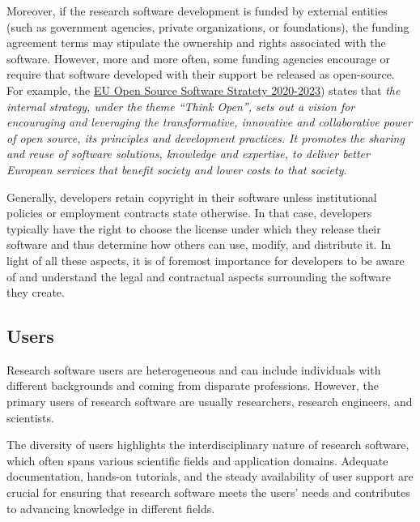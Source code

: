 Moreover, if the research software development is funded by external entities (such as government agencies, private organizations, or foundations), the funding agreement terms may stipulate the ownership and rights associated with the software. However, more and more often, some funding agencies encourage or require that software developed with their support be released as open-source. For example, the \href{https://commission.europa.eu/about-european-commission/departments-and-executive-agencies/digital-services/open-source-software-strategy_en}{EU Open Source Software Stratety 2020-2023}) states that \textit{the internal strategy, under the theme ``Think Open'', sets out a vision for encouraging and leveraging the transformative, innovative and collaborative power of open source, its principles and development practices. It promotes the sharing and reuse of software solutions, knowledge and expertise, to deliver better European services that benefit society and lower costs to that society}.

Generally, developers retain copyright in their software unless institutional policies or employment contracts state otherwise. In that case, developers typically have the right to choose the license under which they release their software and thus determine how others can use, modify, and distribute it. In light of all these aspects, it is of foremost importance for developers to be aware of and understand the legal and contractual aspects surrounding the software they create.


\subsection{Users}

Research software users are heterogeneous and can include individuals with different backgrounds and coming from disparate professions. However, the primary users of research software are usually researchers, research engineers, and scientists.

The diversity of users highlights the interdisciplinary nature of research software, which often spans various scientific fields and application domains. Adequate documentation, hands-on tutorials, and the steady availability of user support are crucial for ensuring that research software meets the users' needs and contributes to advancing knowledge in different fields.

